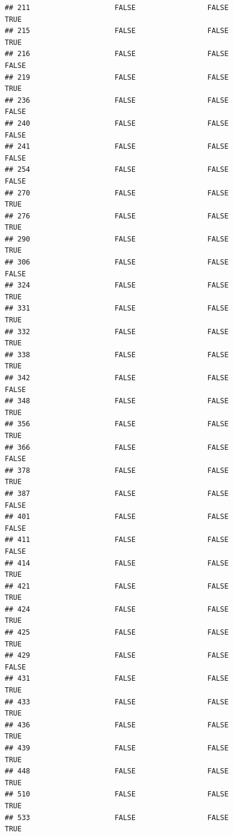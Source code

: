 \documentclass[
]{article}
\begin{document}
\begin{verbatim}
## 211                    FALSE                 FALSE                TRUE
## 215                    FALSE                 FALSE                TRUE
## 216                    FALSE                 FALSE               FALSE
## 219                    FALSE                 FALSE                TRUE
## 236                    FALSE                 FALSE               FALSE
## 240                    FALSE                 FALSE               FALSE
## 241                    FALSE                 FALSE               FALSE
## 254                    FALSE                 FALSE               FALSE
## 270                    FALSE                 FALSE                TRUE
## 276                    FALSE                 FALSE                TRUE
## 290                    FALSE                 FALSE                TRUE
## 306                    FALSE                 FALSE               FALSE
## 324                    FALSE                 FALSE                TRUE
## 331                    FALSE                 FALSE                TRUE
## 332                    FALSE                 FALSE                TRUE
## 338                    FALSE                 FALSE                TRUE
## 342                    FALSE                 FALSE               FALSE
## 348                    FALSE                 FALSE                TRUE
## 356                    FALSE                 FALSE                TRUE
## 366                    FALSE                 FALSE               FALSE
## 378                    FALSE                 FALSE                TRUE
## 387                    FALSE                 FALSE               FALSE
## 401                    FALSE                 FALSE               FALSE
## 411                    FALSE                 FALSE               FALSE
## 414                    FALSE                 FALSE                TRUE
## 421                    FALSE                 FALSE                TRUE
## 424                    FALSE                 FALSE                TRUE
## 425                    FALSE                 FALSE                TRUE
## 429                    FALSE                 FALSE               FALSE
## 431                    FALSE                 FALSE                TRUE
## 433                    FALSE                 FALSE                TRUE
## 436                    FALSE                 FALSE                TRUE
## 439                    FALSE                 FALSE                TRUE
## 448                    FALSE                 FALSE                TRUE
## 510                    FALSE                 FALSE                TRUE
## 533                    FALSE                 FALSE                TRUE

\end{verbatim}
\end{document}
